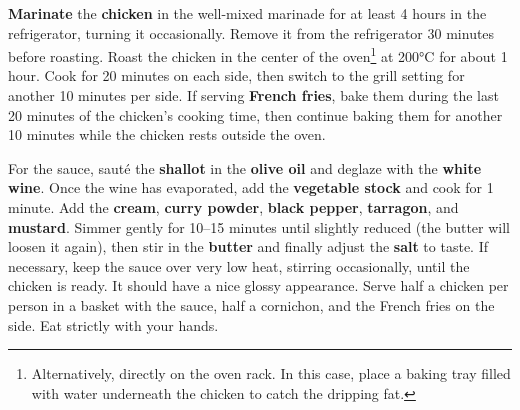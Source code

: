 \vspace{-0.2 cm}

\textbf{Marinate} the \textbf{chicken} in the well-mixed marinade for at least 4 hours in the refrigerator, turning it occasionally.
Remove it from the refrigerator 30 minutes before roasting.
Roast the chicken in the center of the oven\footnote{Alternatively, directly on the oven rack. In this case, place a baking tray filled with water underneath the chicken to catch the dripping fat.} at 200°C for about 1 hour.
Cook for 20 minutes on each side, then switch to the grill setting for another 10 minutes per side.
If serving \textbf{French fries}, bake them during the last 20 minutes of the chicken's cooking time, then continue baking them for another 10 minutes while the chicken rests outside the oven.

For the sauce, sauté the \textbf{shallot} in the \textbf{olive oil} and deglaze with the \textbf{white wine}.
Once the wine has evaporated, add the \textbf{vegetable stock} and cook for 1 minute.
Add the \textbf{cream}, \textbf{curry powder}, \textbf{black pepper}, \textbf{tarragon}, and \textbf{mustard}.
Simmer gently for 10--15 minutes until slightly reduced (the butter will loosen it again), then stir in the \textbf{butter} and finally adjust the \textbf{salt} to taste.
If necessary, keep the sauce over very low heat, stirring occasionally, until the chicken is ready.
It should have a nice glossy appearance.
Serve half a chicken per person in a basket with the sauce, half a cornichon, and the French fries on the side. Eat strictly with your hands.

\begin{recipeblock}
	
\end{recipeblock}
